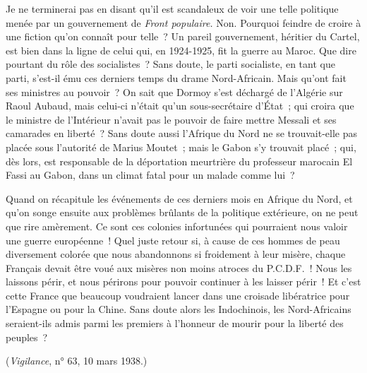 \documentclass[french,twoside]{book} %
\begin{document}
Je ne terminerai pas en disant qu'il est scandaleux de voir une telle politi­que menée par un gouvernement de {\itshape Front populaire.} Non. Pourquoi feindre de croire à une fiction qu'on connaît pour telle ? Un pareil gouvernement, héritier du Cartel, est bien dans la ligne de celui qui, en 1924-1925, fit la guerre au Maroc. Que dire pourtant du rôle des socialistes ? Sans doute, le parti socialiste, en tant que parti, s'est-il ému ces derniers temps du drame Nord-Africain. Mais qu'ont fait ses ministres au pouvoir ? On sait que Dormoy s'est déchargé de l'Algérie sur Raoul Aubaud, mais celui-ci n'était qu'un sous-secrétaire d'État ; qui croira que le ministre de l'Intérieur n'avait pas le pouvoir de faire mettre Messali et ses camarades en liberté ? Sans doute aussi l'Afrique du Nord ne se trouvait-elle pas placée sous l'autorité de Marius Moutet ; mais le Gabon s'y trouvait placé ; qui, dès lors, est responsable de la déportation meurtrière du professeur marocain El Fassi au Gabon, dans un climat fatal pour un malade comme lui ?\par
Quand on récapitule les événements de ces derniers mois en Afrique du Nord, et qu'on songe ensuite aux problèmes brûlants de la politique extérieure, on ne peut que rire amèrement. Ce sont ces colonies infortunées qui pourraient nous valoir une guerre européenne ! Quel juste retour si, à cause de ces hommes de peau diversement colorée que nous abandonnons si froidement à leur misère, chaque Français devait être voué aux misères non moins atroces du P.C.D.F. ! Nous les laissons périr, et nous périrons pour pouvoir continuer à les laisser périr ! Et c'est cette France que beaucoup voudraient lancer dans une croisade libératrice pour l'Espagne ou pour la Chine. Sans doute alors les Indochinois, les Nord-Africains seraient-ils admis parmi les premiers à l'honneur de mourir pour la liberté des peuples ?\par
({\itshape Vigilance}, n° 63, 10 mars 1938.)\par
\par
\end{document}

